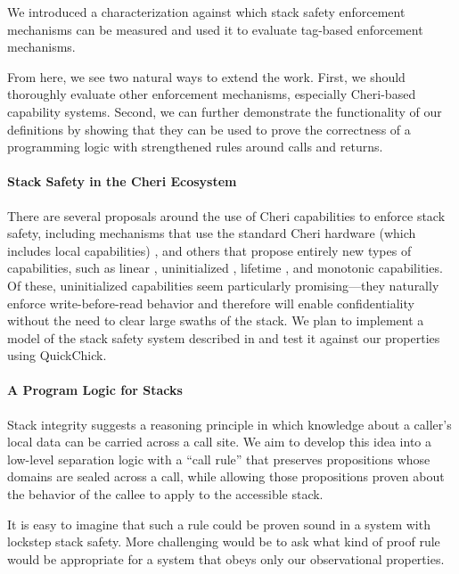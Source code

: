 \documentclass[acmsmall,review,anonymous]{acmart}\settopmatter{printfolios=true,printccs=false,printacmref=false}
\begin{document}
{We introduced a characterization against which stack safety enforcement
mechanisms can be measured and used it to evaluate tag-based enforcement mechanisms.

From here, we see two natural ways to extend the work. First, we should thoroughly evaluate
other enforcement mechanisms, especially Cheri-based capability
systems. Second, we can further demonstrate
the functionality of our definitions by showing that they can be used to prove
the correctness of a programming logic with strengthened rules around calls and returns.

\paragraph*{Stack Safety in the Cheri Ecosystem}

There are several proposals around the use of Cheri capabilities to enforce stack safety,
including mechanisms that use the standard Cheri hardware (which includes local
capabilities) \citep{SkorstengaardLocal},
and others that propose entirely new types of capabilities, such as linear
\citep{SkorstengaardSTK}, uninitialized \citep{Georges+21}, lifetime
\citep{Tsampas+19}, and monotonic \citep{GeorgesComplete} capabilities.
Of these, uninitialized capabilities seem particularly promising---they naturally enforce
write-before-read behavior and therefore will enable confidentiality without the need
to clear large swaths of the stack. We plan to implement a model of the stack safety
system described in \citet{Georges+21} and test it against our properties using
QuickChick.

\paragraph*{A Program Logic for Stacks}

Stack integrity suggests a reasoning principle in which knowledge about a
caller's local data can be carried across a call site. We aim to develop
this idea into a low-level separation logic with a ``call rule'' that
preserves propositions whose domains are sealed across a call, while
allowing those propositions proven about the behavior of the callee to apply
to the accessible stack.

It is easy to imagine that such a rule could be proven sound in a system
with lockstep stack safety. More challenging would be to ask what kind of
proof rule would be appropriate for a system that obeys only our
observational properties.

}
\end{document}
